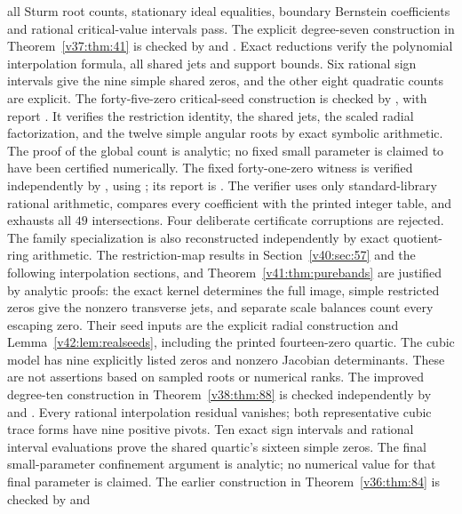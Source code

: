 \documentclass[UTF8,11pt]{ctexart}
\theoremstyle{definition}
\numberwithin{equation}{section}
\begin{document}
all Sturm root counts, stationary ideal equalities, boundary
Bernstein coefficients and rational critical-value intervals pass.
The explicit degree-seven construction in Theorem~\ref{v37:thm:41}
is checked by  and
. Exact reductions verify
the polynomial interpolation formula, all shared jets and support
bounds. Six rational sign intervals give the nine simple shared
zeros, and the other eight quadratic counts are explicit.
The forty-five-zero critical-seed construction is checked by
, with report
. It verifies the restriction
identity, the shared jets, the scaled radial factorization, and
the twelve simple angular roots by exact symbolic arithmetic.
The proof of the global count is analytic; no fixed small
parameter is claimed to have been certified numerically.
The fixed forty-one-zero witness is verified independently by
, using
; its report is
. The verifier uses
only standard-library rational arithmetic, compares every
coefficient with the printed integer table, and exhausts all
$49$ intersections. Four deliberate certificate corruptions
are rejected. The family specialization is also reconstructed
independently by exact quotient-ring arithmetic.
The restriction-map results in Section~\ref{v40:sec:57} and
the following interpolation sections, and Theorem~\ref{v41:thm:purebands}
are justified by analytic proofs: the exact
kernel determines the full image, simple restricted zeros
give the nonzero transverse jets, and separate scale balances
count every escaping zero. Their seed inputs are the explicit radial construction and
Lemma~\ref{v42:lem:realseeds}, including the printed
fourteen-zero quartic. The cubic model has nine explicitly
listed zeros and nonzero Jacobian determinants. These are
not assertions based on sampled roots or numerical ranks.
The improved degree-ten construction in Theorem~\ref{v38:thm:88}
is checked independently by  and
. Every rational interpolation
residual vanishes; both representative cubic trace forms have
nine positive pivots. Ten exact sign intervals and rational
interval evaluations prove the shared quartic's sixteen simple
zeros. The final small-parameter confinement argument is analytic;
no numerical value for that final parameter is claimed.
The earlier construction in Theorem~\ref{v36:thm:84} is checked by
 and
\end{document}
